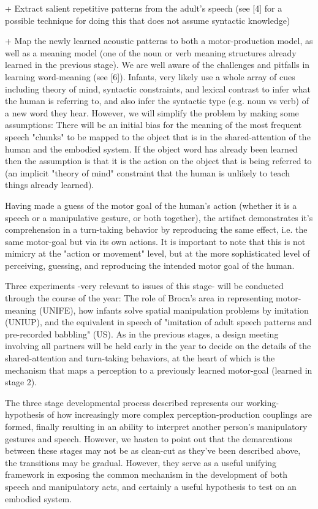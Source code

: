 + Extract salient repetitive patterns from the adult's speech (see [4]
  for a possible technique for doing this that does not assume
  syntactic knowledge)

+ Map the newly learned acoustic patterns to both a motor-production
  model, as well as a meaning model (one of the noun or verb meaning
  structures already learned in the previous stage). We are well aware
  of the challenges and pitfalls in learning word-meaning (see
  [6]). Infants, very likely use a whole array of cues including
  theory of mind, syntactic constraints, and lexical contrast to infer
  what the human is referring to, and also infer the syntactic type
  (e.g. noun vs verb) of a new word they hear. However, we will
  simplify the problem by making some assumptions: There will be an
  initial bias for the meaning of the most frequent speech "chunks" to
  be mapped to the object that is in the shared-attention of the human
  and the embodied system. If the object word has already been learned
  then the assumption is that it is the action on the object that is
  being referred to (an implicit "theory of mind" constraint that the
  human is unlikely to teach things already learned).

Having made a guess of the motor goal of the human's action (whether
it is a speech or a manipulative gesture, or both together), the
artifact demonstrates it's comprehension in a turn-taking behavior by
reproducing the same effect, i.e. the same motor-goal but via its own
actions. It is important to note that this is not mimicry at the
"action or movement" level, but at the more sophisticated level of
perceiving, guessing, and reproducing the intended motor goal of the
human.

Three experiments -very relevant to issues of this stage- will be
conducted through the course of the year: The role of Broca's area in
representing motor-meaning (UNIFE), how infants solve spatial
manipulation problems by imitation (UNIUP), and the equivalent in
speech of "imitation of adult speech patterns and pre-recorded
babbling" (US). As in the previous stages, a design meeting involving
all partners will be held early in the year to decide on the details
of the shared-attention and turn-taking behaviors, at the heart of
which is the mechanism that maps a perception to a previously learned
motor-goal (learned in stage 2).

The three stage developmental process described represents our
working-hypothesis of how increasingly more complex
perception-production couplings are formed, finally resulting in an
ability to interpret another person's manipulatory gestures and
speech. However, we hasten to point out that the demarcations between
these stages may not be as clean-cut as they've been described above,
the transitions may be gradual. However, they serve as a useful
unifying framework in exposing the common mechanism in the development
of both speech and manipulatory acts, and certainly a useful
hypothesis to test on an embodied system.



